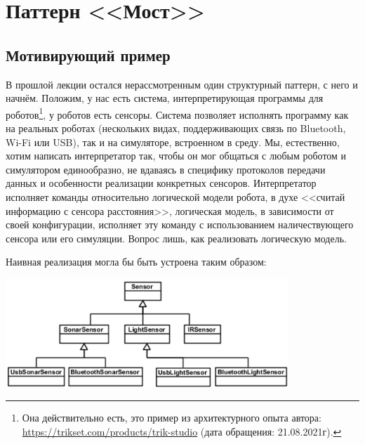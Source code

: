 \documentclass{../text-style}
\author{Юрий Литвинов\\\small{y.litvinov@spbu.ru}}
\begin{document}
\maketitle
\thispagestyle{empty}

\section{Паттерн <<Мост>>}

\subsection{Мотивирующий пример}

В прошлой лекции остался нерассмотренным один структурный паттерн, с него и начнём. Положим, у нас есть система, интерпретирующая программы для роботов\footnote{Она действительно есть, это пример из архитектурного опыта автора: \url{https://trikset.com/products/trik-studio} (дата обращения: 21.08.2021г).}, у роботов есть сенсоры. Система позволяет исполнять программу как на реальных роботах (нескольких видах, поддерживающих связь по Bluetooth, Wi-Fi или USB), так и на симуляторе, встроенном в среду. Мы, естественно, хотим написать интерпретатор так, чтобы он мог общаться с любым роботом и симулятором единообразно, не вдаваясь в специфику протоколов передачи данных и особенности реализации конкретных сенсоров. Интерпретатор исполняет команды относительно логической модели робота, в духе <<считай информацию с сенсора расстояния>>, логическая модель, в зависимости от своей конфигурации, исполняет эту команду с использованием наличествующего сенсора или его симуляции. Вопрос лишь, как реализовать логическую модель.

Наивная реализация могла бы быть устроена таким образом:

\begin{center}
    \includegraphics[width=0.8\textwidth]{noBridge.png}
\end{center}
\end{document}
